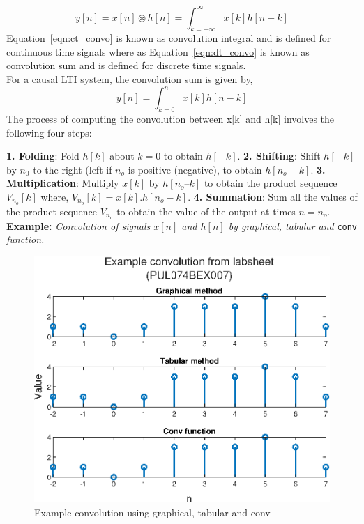 \documentclass{lab_sheet}
\begin{document}
\begin{equation}
    y[n]=x[n]\circledast h[n]=\int_{k=-\infty}^{\infty}x[k]h[n-k]
    \label{eqn:dt_convo}
\end{equation}
 Equation~\ref{eqn:ct_convo} is known as convolution integral and is defined for continuous time signals where as Equation~\ref{eqn:dt_convo} is known as convolution sum and is defined for discrete time signals.
 \\
 For a causal LTI system, the convolution sum is given by,
 \begin{equation}
    y[n]=\int_{k=0}^{n}x[k]h[n-k]
    \label{eqn:causal_convo}
\end{equation}
The process of computing the convolution between x[k] and h[k] involves the following four
steps:

    \textbf{1. Folding}: Fold $h[k]$ about $k=0$ to obtain $h[-k]$.
    \textbf{2. Shifting}: Shift $h[-k]$ by $n_0$ to the right (left if $n_o$ is positive (negative), to obtain $h[n_o-k]$.
    \textbf{3. Multiplication}: Multiply $x[k]$ by $h[n_o–k]$ to obtain the product sequence $V_{n_o}[k]$ where, $V_{n_o}[k]=x[k].h[n_o-k]$.
   \textbf{4. Summation}: Sum all the values of the product sequence $V_{n_o}$ to obtain the value of
    the output at times $n=n_o$.
    \newpage
    \textbf{Example:} \textit{Convolution of signals $x[n]$ and $h[n]$ by graphical, tabular and} \texttt{conv} \textit{function.} 
    \begin{figure}[H]
        \centering
        \includegraphics[width=0.8\linewidth]{../Figures/lab_3_example_all.eps}
        \caption{Example convolution using graphical, tabular and conv}
        \label{fig:example}
    \end{figure}
\end{document}
